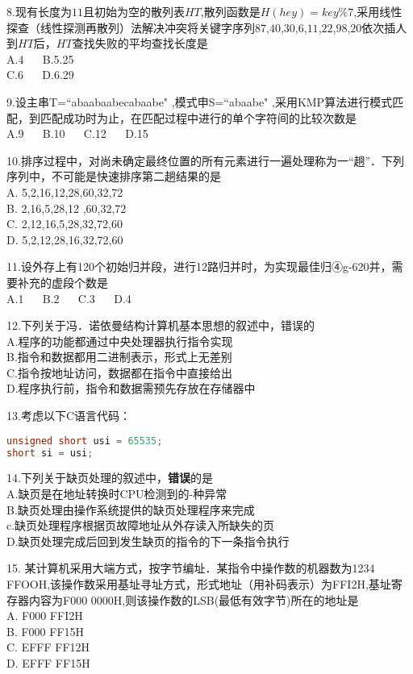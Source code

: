 8.现有长度为$11$且初始为空的散列表$HT$,散列函数是$H(hey)= key\%7$,采用线性探查（线性探测再散列）法解决冲突将关键字序列$87$,$40$,$30$,$6$,$11$,$22$,$98$,$20$依次插人到$HT$后，$HT$查找失败的平均查找长度是 \\
A.4 $\quad$ B.5.25 \\
C.6 $\quad$ D.6.29

9.设主串T=“abaabaabecabaabe" ,模式申S=“abaabe" ,采用KMP算法进行模式匹配，到匹配成功时为止，在匹配过程中进行的单个字符间的比较次数是 \\
A.9 $\quad$ B.10 $\quad$ C.12 $\quad$ D.15

10.排序过程中，对尚未确定最终位置的所有元素进行一遍处理称为一“趟”．下列序列中，不可能是快速排序第二趟结果的是 \\
A. 5,2,16,12,28,60,32,72 \\
B. 2,16,5,28,12 ,60,32,72 \\
C. 2,12,16,5,28,32,72,60 \\
D. 5,2,12,28,16,32,72,60

11.设外存上有120个初始归并段，进行12路归并时，为实现最佳归④g-620并，需要补充的虚段个数是 \\
A.1 $\quad$ B.2 $\quad$ C.3 $\quad$ D.4

12.下列关于冯．诺依曼结构计算机基本思想的叙述中，错误的 \\
A.程序的功能都通过中央处理器执行指令实现 \\
B.指令和数据都用二进制表示，形式上无差别 \\
C.指令按地址访问，数据都在指令中直接给出 \\
D.程序执行前，指令和数据需预先存放在存储器中

13.考虑以下C语言代码：
\begin{lstlisting}[language=cpp]
unsigned short usi = 65535;
short si = usi;
\end{lstlisting}

14.下列关于缺页处理的叙述中，\textbf{错误}的是 \\
A.缺页是在地址转换时CPU检测到的-种异常 \\
B.缺页处理由操作系统提供的缺页处理程序来完成 \\
c.缺页处理程序根据页故障地址从外存读入所缺失的页 \\
D.缺页处理完成后回到发生缺页的指令的下一条指令执行

15. 某计算机采用大端方式，按字节编址．某指令中操作数的机器数为1234 FFOOH,该操作数采用基址寻址方式，形式地址（用补码表示）为FFI2H,基址寄存器内容为F000 0000H,则该操作数的LSB(最低有效字节)所在的地址是 \\
A. F000 FFI2H \\
B. F000 FF15H \\
C. EFFF FF12H \\
D. EFFF FF15H

